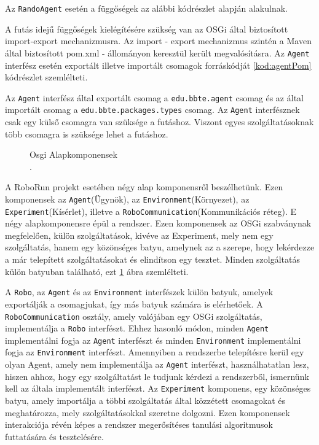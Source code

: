 Az \texttt{RandoAgent} esetén a függőségek az alábbi kódrészlet alapján alakulnak.
\lstset{language=xml}


A futás idejű függőségek kielégítésére szükség van az OSGi által biztosított import-export mechanizmusra. Az import - export mechanizmus szintén a Maven által biztosított pom.xml - állományon keresztül került megvalósításra. Az \texttt{Agent} interfész esetén exportált illetve importált csomagok forráskódját \ref{kod:agentPom} kódrészlet szemlélteti.

\lstset{language=xml}
\label{kod:agentPom}

Az \texttt{Agent} interfész által exportált csomag a \texttt{edu.bbte.agent} csomag és az által importált csomag a \texttt{edu.bbte.packages.types} csomag. Az \texttt{Agent} interfésznek csak egy külső csomagra van szüksége a futáshoz. Viszont egyes szolgáltatásoknak több csomagra is szüksége lehet a futáshoz.

 

\begin{figure}[h!]
  \centering
  \caption[A RoboRun projekt alapkomponensei]%
  {Osgi Alapkomponensek\\
  {\white .}\hfill\url{}}
  \label{fig:OsgiAlapkomponensek}
\end{figure}

A RoboRun projekt esetében négy alap komponensről beszélhetünk. Ezen komponensek az \texttt{Agent}(Ügynök), az \texttt{Environment}(Környezet), az \texttt{Experiment}(Kísérlet), illetve a \texttt{RoboCommunication}(Kommunikációs réteg). E négy alapkomponensre épül a rendszer. Ezen komponensek az OSGi szabványnak megfelelően, külön szolgáltatások, kivéve az Experiment, mely nem egy szolgáltatás, hanem egy közönséges batyu, amelynek az a szerepe, hogy lekérdezze a már telepített szolgáltatásokat és elindítson egy tesztet. Minden szolgáltatás külön batyuban található, ezt \ref{fig:OsgiAlapkomponensek} ábra szemlélteti. 


A \texttt{Robo}, az \texttt{Agent} és az \texttt{Environment} interfészek külön batyuk, amelyek exportálják a csomagjukat, így más batyuk számára is elérhetőek. A \texttt{RoboCommunication} osztály, amely valójában egy OSGi szolgáltatás, implementálja a \texttt{Robo} interfészt. Ehhez hasonló módon, minden \texttt{Agent} implementálni fogja az \texttt{Agent} interfészt és minden \texttt{Environment} implementálni fogja az \texttt{Environment} interfészt. Amennyiben a rendszerbe telepítésre kerül egy olyan Agent, amely nem implementálja az \texttt{Agent} interfészt, használhatatlan lesz, hiszen ahhoz, hogy egy szolgáltatást le tudjunk kérdezi a rendszerből, ismernünk kell az általa implementált interfészt. Az \texttt{Experiment} komponens, egy közönséges batyu, amely importálja a többi szolgáltatás által közzétett csomagokat és meghatározza, mely szolgáltatásokkal szeretne dolgozni. Ezen komponensek interakciója révén képes a rendszer megerősítéses tanulási algoritmusok futtatására és tesztelésére.

